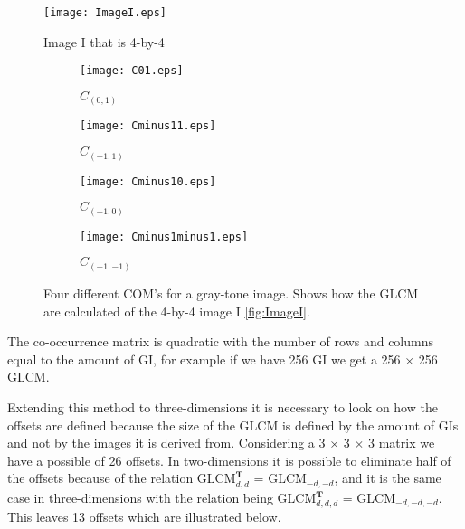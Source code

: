 \begin{figure}[H]
  \centering
  \texttt{[image: ImageI.eps]}
  \caption{Image I that is 4-by-4}\label{fig:ImageI}
    \begin{subfigure}{.24\textwidth}
      \centering
      \texttt{[image: C01.eps]}
      \caption{$C_{(0,1)}$}\label{fig:c01}
    \end{subfigure}
    \begin{subfigure}{.24\textwidth}
      \centering
      \texttt{[image: Cminus11.eps]}
      \caption{$C_{(-1,1)}$}\label{fig:cminus11}
    \end{subfigure}
    \begin{subfigure}{.24\textwidth}
      \centering
      \texttt{[image: Cminus10.eps]}
      \caption{$C_{(-1,0)}$}\label{fig:cminus10}
    \end{subfigure}
    \begin{subfigure}{.24\textwidth}
      \centering
      \texttt{[image: Cminus1minus1.eps]}
      \caption{$C_{(-1,-1)}$}\label{fig:cminus1minus1}
    \end{subfigure}
    \caption{Four different COM's for a gray-tone image. Shows how the GLCM are calculated of the 4-by-4 image I \ref{fig:ImageI}.}
\end{figure}
The co-occurrence matrix is quadratic with the number of rows and columns equal to the amount of GI, for example if we have 256 GI we get a 256 $\times$ 256 GLCM.

Extending this method to three-dimensions it is necessary to look on how the offsets are defined because the size of the GLCM is defined by the amount of GIs and not by the images it is derived from. Considering a 3 $\times$ 3 $\times$ 3 matrix we have a possible of 26 offsets. In two-dimensions it is possible to eliminate half of the offsets because of the relation GLCM$_{d,d}^\textbf{T}$ = GLCM$_{-d,-d}$, and it is the same case in three-dimensions with the relation being GLCM$_{d,d,d}^\textbf{T}$ = GLCM$_{-d,-d,-d}$. This leaves 13 offsets which are illustrated below.\\

